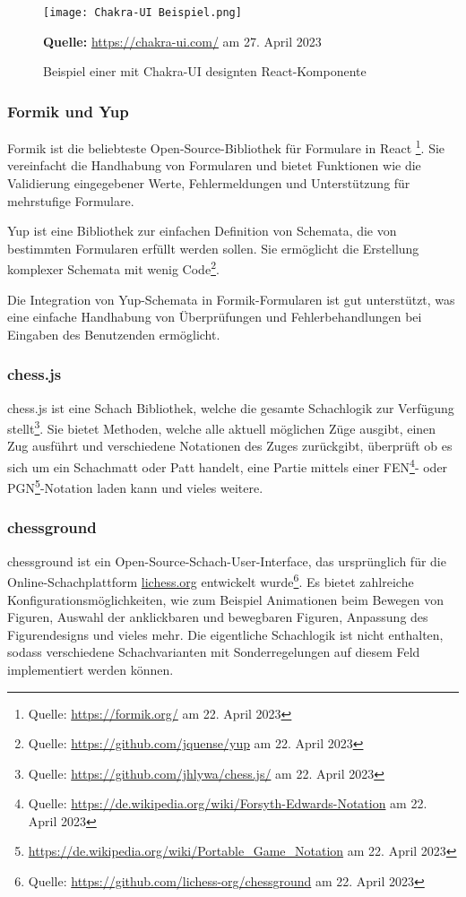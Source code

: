   \begin{figure}[H]
  \centering
  \texttt{[image: Chakra-UI Beispiel.png]}
  
\raggedleft
    \footnotesize\sffamily\textbf{Quelle:} \url{https://chakra-ui.com/} am 27. April 2023
  \caption{Beispiel einer mit Chakra-UI designten React-Komponente}
  \label{fig:chakra-example}
\end{figure}
  

        \subsubsection{Formik und Yup}
        \label{sec:formik}
Formik ist die beliebteste Open-Source-Bibliothek für Formulare in React \footnote{Quelle: \url{https://formik.org/} am 22. April 2023}. Sie vereinfacht die Handhabung von Formularen und bietet Funktionen wie die Validierung eingegebener Werte, Fehlermeldungen und Unterstützung für mehrstufige Formulare.

Yup ist eine Bibliothek zur einfachen Definition von Schemata, die von bestimmten Formularen erfüllt werden sollen. Sie ermöglicht die Erstellung komplexer Schemata mit wenig Code\footnote{Quelle: \url{https://github.com/jquense/yup} am 22. April 2023}.

Die Integration von Yup-Schemata in Formik-Formularen ist gut unterstützt, was eine einfache Handhabung von Überprüfungen und Fehlerbehandlungen bei Eingaben des Benutzenden ermöglicht.

        \subsubsection{chess.js}
        \label{sec:chess.js}
chess.js ist eine Schach Bibliothek, welche die gesamte Schachlogik zur Verfügung stellt\footnote{Quelle: \url{https://github.com/jhlywa/chess.js/} am 22. April 2023}. Sie bietet Methoden, welche alle aktuell möglichen Züge ausgibt, einen Zug ausführt und verschiedene Notationen des Zuges zurückgibt, überprüft ob es sich um ein Schachmatt oder Patt handelt, eine Partie mittels einer FEN\footnote{Quelle: \url{https://de.wikipedia.org/wiki/Forsyth-Edwards-Notation} am 22. April 2023}- oder PGN\footnote{\url{https://de.wikipedia.org/wiki/Portable_Game_Notation} am 22. April 2023}-Notation laden kann und vieles weitere. 
        \subsubsection{chessground}
        \label{sec:chessground}
chessground ist ein Open-Source-Schach-User-Interface, das ursprünglich für die Online-Schachplattform \url{lichess.org} entwickelt wurde\footnote{Quelle: \url{https://github.com/lichess-org/chessground} am 22. April 2023}. Es bietet zahlreiche Konfigurationsmöglichkeiten, wie zum Beispiel Animationen beim Bewegen von Figuren, Auswahl der anklickbaren und bewegbaren Figuren, Anpassung des Figurendesigns und vieles mehr. Die eigentliche Schachlogik ist nicht enthalten, sodass verschiedene Schachvarianten mit Sonderregelungen auf diesem Feld implementiert werden können.

